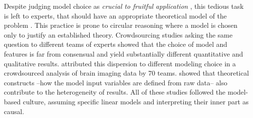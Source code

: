 \documentclass[french,12pt,twoside,a4paper]{book}
\begin{document}
Despite judging model choice as \textit{crucial to fruitful application}
\citep{cox2006principles}, this tedious task is left to experts, that should have an
appropriate theoretical model of the problem \citep{cox2001statistical}. This
practice is prone to circular reasoning where a model is chosen only to justify an
established theory. \textcolor{h_color}{Crowdsourcing studies asking the same question to
  different teams of experts showed that the choice of model and features is far
  from consensual and yield substantially different quantitative and qualitative
  results.} \cite{botvinik2020variability} attributed this dispersion to different
modeling choice in a crowdsourced analysis of brain imaging data by 70 teams.
\cite{schweinsberg2021same} showed that theoretical constructs --how the
model input variables are defined from raw data-- also contribute to the heterogeneity of results.
All of these studies followed the model-based culture, assuming specific linear
models and interpreting their inner part as causal.

\end{document}
